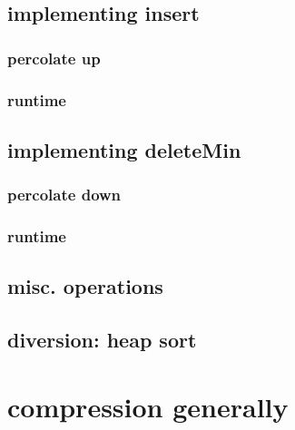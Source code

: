 

\subsection{implementing insert}



\subsubsection{percolate up}




\subsubsection{runtime}



\subsection{implementing deleteMin}



\subsubsection{percolate down}




\subsubsection{runtime}



\subsection{misc. operations}



\subsection{diversion: heap sort}



\section{compression generally} 

